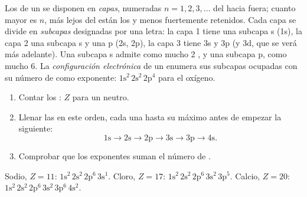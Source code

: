 \begin{definition}\label{def:g10:electron-shells:configuration}
Los  de un  se disponen en \emph{capas},
numeradas $n = 1, 2, 3, \ldots$ del  hacia fuera; cuanto mayor es
$n$, más lejos del  están los  y menos fuertemente
retenidos. Cada capa se divide en \emph{subcapas}
designadas por una letra: la capa 1 tiene una subcapa s (1s), la capa 2
una subcapa s y una p (2s, 2p), la capa 3 tiene 3s y 3p (y 3d, que se
verá más adelante). Una subcapa s admite como mucho 2 , y una
subcapa p, como mucho 6. La
\emph{configuración electrónica} de un
 enumera sus subcapas ocupadas con su número de  como
exponente: $1\mathrm{s}^2\,2\mathrm{s}^2\,2\mathrm{p}^4$ para el oxígeno.
\end{definition}

\begin{method}[Escribir una configuración electrónica, hasta $Z = 20$]\label{met:g10:electron-shells:write}
\begin{enumerate}
  \item Contar los : $Z$ para un  neutro.
  \item Llenar las  en este orden, cada una hasta su máximo
        antes de empezar la siguiente:
        \[
          1\mathrm{s} \to 2\mathrm{s} \to 2\mathrm{p} \to 3\mathrm{s} \to
          3\mathrm{p} \to 4\mathrm{s}.
        \]
  \item Comprobar que los exponentes suman el número de .
\end{enumerate}
Sodio, $Z = 11$: $1\mathrm{s}^2\,2\mathrm{s}^2\,2\mathrm{p}^6\,3\mathrm{s}^1$.
Cloro, $Z = 17$: $1\mathrm{s}^2\,2\mathrm{s}^2\,2\mathrm{p}^6\,3\mathrm{s}^2\,3\mathrm{p}^5$.
Calcio, $Z = 20$: $1\mathrm{s}^2\,2\mathrm{s}^2\,2\mathrm{p}^6\,3\mathrm{s}^2\,3\mathrm{p}^6\,4\mathrm{s}^2$.
\end{method}

